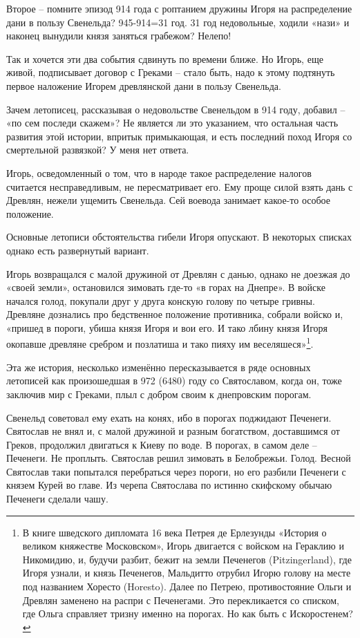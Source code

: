 Второе – помните эпизод 914 года с роптанием дружины Игоря на распределение дани в пользу Свенельда? 945-914=31 год. 31 год недовольные, ходили «нази» и наконец вынудили князя заняться грабежом? Нелепо! 

Так и хочется эти два события сдвинуть по времени ближе. Но Игорь, еще живой, подписывает договор с Греками – стало быть, надо к этому подтянуть первое наложение Игорем древлянской дани в пользу Свенельда. 

Зачем летописец, рассказывая о недовольстве Свенельдом в 914 году, добавил – «по сем последи скажем»? Не является ли это указанием, что остальная часть развития этой истории, впритык примыкающая, и есть последний поход Игоря со смертельной развязкой? У меня нет ответа.

Игорь, осведомленный о том, что в народе такое распределение налогов считается несправедливым, не пересматривает его. Ему проще силой взять дань с Древлян, нежели ущемить Свенельда. Сей воевода занимает какое-то особое положение.

Основные летописи обстоятельства гибели Игоря опускают. В некоторых списках однако есть развернутый вариант.

Игорь возвращался с малой дружиной от Древлян с данью, однако не доезжая до «своей земли», остановился зимовать где-то «в горах на Днепре». В войске начался голод, покупали друг у друга конскую голову по четыре гривны. Древляне дознались про бедственное положение противника, собрали войско и, «пришед в пороги, убиша князя Игоря и вои его. И тако лбину князя Игоря окопавше древляне сребром и позлатиша и тако пияху им веселяшеся»\footnote{В книге шведского дипломата 16 века Петрея де Ерлезунды «История о великом княжестве Московском», Игорь двигается с войском на Гераклию и Никомидию, и, будучи разбит, бежит на земли Печенегов (Pitzingerland), где Игоря узнали, и князь Печенегов, Мальдитто отрубил Игорю голову на месте под названием Хоресто (Horesto). Далее по Петрею, противостояние Ольги и Древлян заменено на распри с Печенегами. Это перекликается со списком, где Ольга справляет тризну именно на порогах. Но как быть с Искоростенем?}.

Эта же история, несколько изменённо пересказывается в ряде основных летописей как произошедшая в 972 (6480) году со Святославом, когда он, тоже заключив мир с Греками, плыл с добром своим к днепровским порогам. 

Свенельд советовал ему ехать на конях, ибо в порогах поджидают Печенеги. Святослав не внял и, с малой дружиной и разным богатством, доставшимся от Греков, продолжил двигаться к Киеву по воде. В порогах, в самом деле – Печенеги. Не проплыть. Святослав решил зимовать в Белобрежьи. Голод. Весной Святослав таки попытался перебраться через пороги, но его разбили Печенеги с князем Курей во главе. Из черепа Святослава по истинно скифскому обычаю Печенеги сделали чашу.

